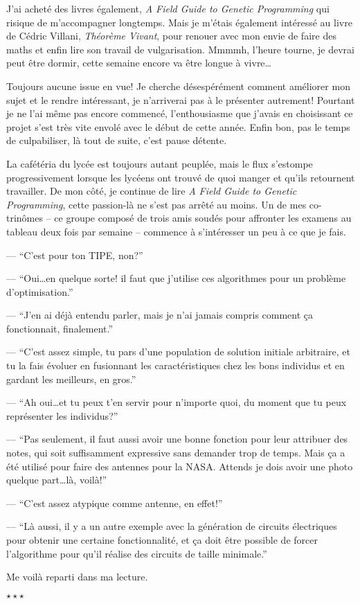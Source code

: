 \documentclass[letterpaper, 12pt]{report} %
\newcommand{\stardelimiter}{{\begin{center}\vspace{0.3cm} $\star \star \star$\vspace{0.3cm}\end{center}}}
\begin{document}
{J'ai acheté des livres également, \textit{A Field Guide to Genetic Programming} qui risique de m'accompagner longtemps.
Mais je m'étais également intéressé au livre de Cédric Villani, \textit{Théorème Vivant}, pour renouer avec mon envie de faire des maths et enfin lire son travail de vulgarisation. 
Mmmmh, l'heure tourne, je devrai peut être dormir, cette semaine encore va être longue à vivre\dots

Toujours aucune issue en vue!
Je cherche désespérément comment améliorer mon sujet et le rendre intéressant, je n'arriverai pas à le présenter autrement!
Pourtant je ne l'ai même pas encore commencé, l'enthousiasme que j'avais en choisissant ce projet s'est très vite envolé avec le début de cette année.
Enfin bon, pas le temps de culpabiliser, là tout de suite, c'est pause détente. 

La cafétéria du lycée est toujours autant peuplée, mais le flux s'estompe progressivement lorsque les lycéens ont trouvé de quoi manger et qu'ils retournent travailler. 
De mon côté, je continue de lire \textit{A Field Guide to Genetic Programming}, cette passion-là ne s'est pas arrêté au moins.
Un de mes co-trinômes -- ce groupe composé de trois amis soudés pour affronter les examens au tableau deux fois par semaine -- commence à s'intéresser un peu à ce que je fais.

--- ``C'est pour ton TIPE, non?''

--- ``Oui\dots en quelque sorte! il faut que j'utilise ces algorithmes pour un problème d'optimisation.''

--- ``J'en ai déjà entendu parler, mais je n'ai jamais compris comment ça fonctionnait, finalement.''

--- ``C'est assez simple, tu pars d'une population de solution initiale arbitraire, et tu la fais évoluer en fusionnant les caractéristiques chez les 			bons individus et en gardant les meilleurs, en gros.''

--- ``Ah oui\dots et tu peux t'en servir pour n'importe quoi, du moment que tu peux représenter les individus?''

--- ``Pas seulement, il faut aussi avoir une bonne fonction pour leur attribuer des notes, qui soit suffisamment expressive sans demander trop de temps. 		Mais ça a été utilisé pour faire des antennes pour la {NASA}. Attends je dois avoir une photo quelque part\dots là, voilà!''

--- ``C'est assez atypique comme antenne, en effet!''

--- ``Là aussi, il y a un autre exemple avec la génération de circuits électriques pour obtenir une certaine fonctionnalité, et ça doit être possible de 			forcer l'algorithme pour qu'il réalise des circuits de taille minimale.''

Me voilà reparti dans ma lecture.

\stardelimiter{}



}
\end{document}
